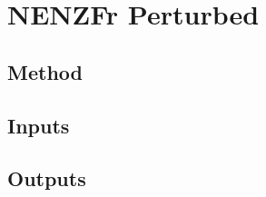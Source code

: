 
\newpage
\section{NENZFr Perturbed}
\label{chapter-perturbed}

\subsection{Method}

\subsection{Inputs}

\subsection{Outputs}